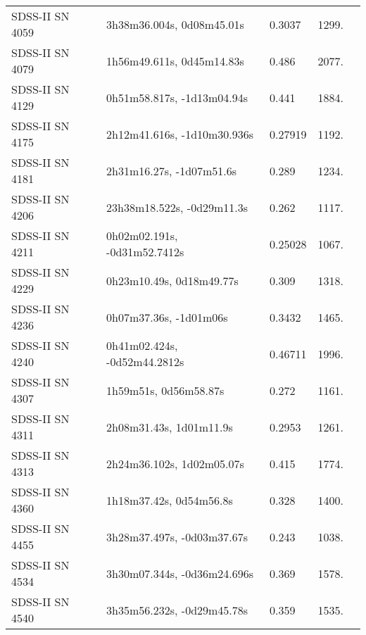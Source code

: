 \begin{longtable}{lllll}
  SDSS-II SN 4059 &      3h38m36.004s, 0d08m45.01s &   0.3037 &          1299. &    \citet{2011ApJ...738..162S} \\
  SDSS-II SN 4079 &      1h56m49.611s, 0d45m14.83s &    0.486 &          2077. &    \citet{2011ApJ...738..162S} \\
  SDSS-II SN 4129 &     0h51m58.817s, -1d13m04.94s &    0.441 &          1884. &    \citet{2011ApJ...738..162S} \\
  SDSS-II SN 4175 &    2h12m41.616s, -1d10m30.936s &  0.27919 &          1192. &    \citet{2016SDSSD.C...0000:} \\
  SDSS-II SN 4181 &       2h31m16.27s, -1d07m51.6s &    0.289 &          1234. &    \citet{2010ApJ...713.1026D} \\
  SDSS-II SN 4206 &     23h38m18.522s, -0d29m11.3s &    0.262 &          1117. &    \citet{2011ApJ...738..162S} \\
  SDSS-II SN 4211 &   0h02m02.191s, -0d31m52.7412s &  0.25028 &          1067. &    \citet{2016SDSSD.C...0000:} \\
  SDSS-II SN 4229 &       0h23m10.49s, 0d18m49.77s &    0.309 &          1318. &    \citet{2011ApJ...738..162S} \\
  SDSS-II SN 4236 &         0h07m37.36s, -1d01m06s &   0.3432 &          1465. &    \citet{2011ApJ...738..162S} \\
  SDSS-II SN 4240 &   0h41m02.424s, -0d52m44.2812s &  0.46711 &          1996. &    \citet{2016SDSSD.C...0000:} \\
  SDSS-II SN 4307 &          1h59m51s, 0d56m58.87s &    0.272 &          1161. &    \citet{2011ApJ...738..162S} \\
  SDSS-II SN 4311 &        2h08m31.43s, 1d01m11.9s &   0.2953 &          1261. &    \citet{2011ApJ...738..162S} \\
  SDSS-II SN 4313 &      2h24m36.102s, 1d02m05.07s &    0.415 &          1774. &    \citet{2005ApJS..158..161H} \\
  SDSS-II SN 4360 &        1h18m37.42s, 0d54m56.8s &    0.328 &          1400. &    \citet{2010ApJ...713.1026D} \\
  SDSS-II SN 4455 &     3h28m37.497s, -0d03m37.67s &    0.243 &          1038. &    \citet{2011ApJ...738..162S} \\
  SDSS-II SN 4534 &    3h30m07.344s, -0d36m24.696s &    0.369 &          1578. &    \citet{2011ApJ...738..162S} \\
  SDSS-II SN 4540 &     3h35m56.232s, -0d29m45.78s &    0.359 &          1535. &    \citet{2011ApJ...738..162S} \\

\end{longtable}
